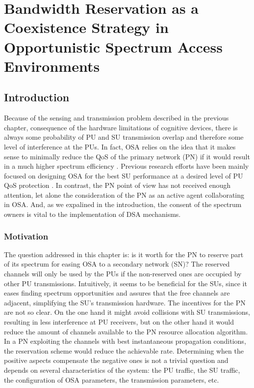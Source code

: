 \graphicspath{ {img/BR/} }
\chapter[Bandwidth Reservation as a Coexistence Strategy in Opportunistic Spectrum Access Environments][Bandwidth Reservation in OSA]{Bandwidth Reservation as a Coexistence Strategy in Opportunistic Spectrum Access Environments}\label{BR_chap}
\section{Introduction}\label{sec:Introduction}
Because of the sensing and transmission problem described in the previous chapter, consequence of the hardware limitations of cognitive devices, there is always some probability of PU and SU transmission overlap and therefore some level of interference at the PUs.
In fact, OSA relies on the idea that it makes sense to minimally reduce the QoS of the primary network (PN) if it would result in a much higher spectrum efficiency \cite{ref:Pawelczak2009}.
Previous research efforts have been mainly focused on designing OSA for the best SU performance at a desired level of PU QoS protection \cite{ref:Domenico2012}. In contrast, the PN point of view has not received enough attention, let alone the consideration of the PN as an active agent collaborating in OSA. And, as we expalined in the introduction, the consent of the spectrum owners is vital to the implementation of DSA mechanisms. 

\subsection{Motivation}
The question addressed in this chapter is: is it worth for the PN to reserve part of its spectrum for easing OSA to a secondary network (SN)? The reserved channels will only be used by the PUs if the non-reserved ones are occupied by other PU transmissions. 
Intuitively, it seems to be beneficial for the SUs, since it eases finding spectrum opportunities and assures that the free channels are adjacent, simplifying the SU's transmission hardware.
The incentives for the PN are not so clear. On the one hand it might avoid collisions with SU transmissions, resulting in less interference at PU receivers, but on the other hand it would reduce the amount of channels available to the PN resource allocation algorithm. In a PN exploiting the channels with best instantaneous propagation conditions, the reservation scheme would reduce the achievable rate.
Determining when the positive aspects compensate the negative ones is not a trivial question and depends on several characteristics of the system: the PU traffic, the SU traffic, the configuration of OSA parameters, the transmission parameters, etc.

